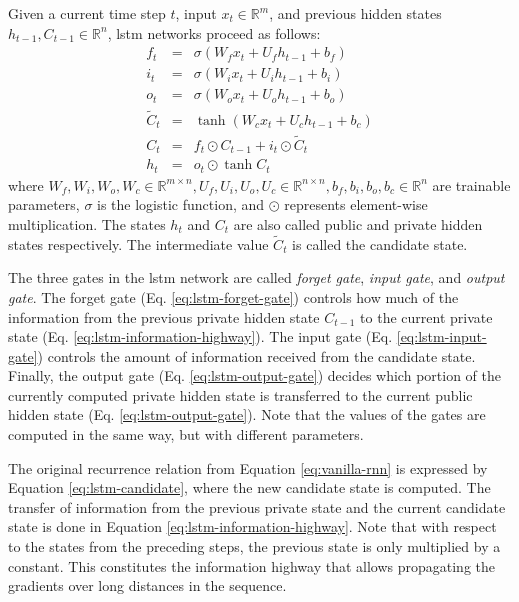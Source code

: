 Given a current time step $t$, input $x_t \in \mathbb{R}^m$, and previous hidden states $h_{t-1}, C_{t-1} \in \mathbb{R}^n$,
\gls{lstm} networks proceed as follows:
%
\begin{eqnarray}
f_t & = & \sigma\left(W_f x_t + U_f h_{t-1} + b_f\right) \label{eq:lstm-forget-gate}\\
i_t & = & \sigma\left(W_i x_t + U_i h_{t-1} + b_i\right) \label{eq:lstm-input-gate}\\
o_t & = & \sigma\left(W_o x_t + U_o h_{t-1} + b_o\right) \label{eq:lstm-output-gate}\\
\tilde{C}_t & = & \tanh \left( W_c x_t + U_c h_{t-1} + b_c \right)\label{eq:lstm-candidate} \\
C_t & = & f_t \odot C_{t-1} + i_t \odot \tilde{C}_t \label{eq:lstm-information-highway}\\
h_t & = & o_t \odot \tanh C_t \label{eq:lstm-hidden-state}
\end{eqnarray}
%
where $W_f, W_i, W_o, W_c \in \mathbb{R}^{m \times n}, U_f, U_i, U_o, U_c \in \mathbb{R}^{n \times n}, b_f, b_i, b_o, b_c \in \mathbb{R}^n$ are trainable parameters, $\sigma$ is the logistic function, and $\odot$ represents element-wise multiplication. The states $h_t$ and
$C_t$ are also called public and private hidden states respectively. The intermediate value
$\tilde{C}_t$ is called the candidate state.

The three gates in the \gls{lstm} network are called \emph{forget gate}, \emph{input gate}, and \emph{output gate}. The forget gate (Eq. \ref{eq:lstm-forget-gate}) controls how much of the information from the previous private hidden state $C_{t-1}$ to the current private state (Eq. \ref{eq:lstm-information-highway}). The input gate (Eq. \ref{eq:lstm-input-gate})
controls the amount of information received from the candidate state. Finally, the
output gate (Eq. \ref{eq:lstm-output-gate}) decides which portion of the currently computed private hidden state is transferred to the current public hidden state (Eq. \ref{eq:lstm-output-gate}). Note that the values of the gates are computed in the same way, but with different parameters.

The original recurrence relation from Equation \ref{eq:vanilla-rnn} is expressed by Equation \ref{eq:lstm-candidate}, where
the new candidate state is computed. The transfer of information from the 
previous private state and the current candidate state is done in Equation \ref{eq:lstm-information-highway}. Note that with respect to the states from the preceding steps, the previous state is only multiplied by a constant. This constitutes the information highway
that allows propagating the gradients over long distances in the sequence.




